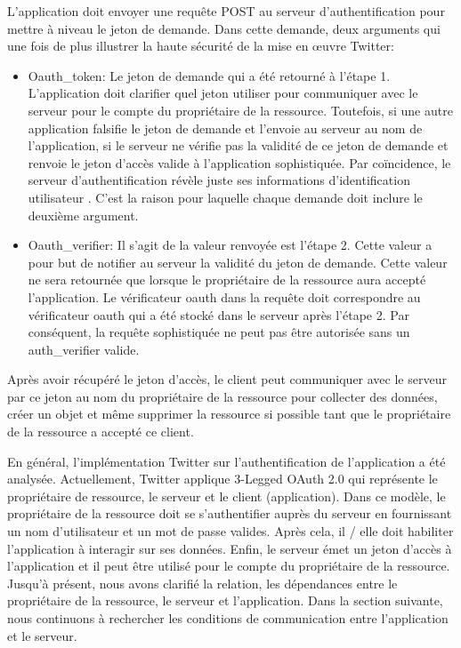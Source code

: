 L'application doit envoyer une requête POST au serveur d'authentification pour mettre à niveau le jeton de demande. Dans cette demande, deux arguments qui une fois de plus illustrer la haute sécurité de la mise en œuvre Twitter:
\begin{itemize}
\item Oauth\_token: Le jeton de demande qui a été retourné à l'étape 1. L'application doit clarifier quel jeton utiliser pour communiquer avec le serveur pour le compte du propriétaire de la ressource. Toutefois, si une autre application falsifie le jeton de demande et l'envoie au serveur au nom de l'application, si le serveur ne vérifie pas la validité de ce jeton de demande et renvoie le jeton d'accès valide à l'application sophistiquée. Par coïncidence, le serveur d'authentification révèle juste ses informations d'identification utilisateur . C'est la raison pour laquelle chaque demande doit inclure le deuxième argument.
\item Oauth\_verifier: Il s'agit de la valeur renvoyée est l'étape 2. Cette valeur a pour but de notifier au serveur la validité du jeton de demande. Cette valeur ne sera retournée que lorsque le propriétaire de la ressource aura accepté l'application. Le vérificateur oauth dans la requête doit correspondre au vérificateur oauth qui a été stocké dans le serveur après l'étape 2. Par conséquent, la requête sophistiquée ne peut pas être autorisée sans un auth\_verifier valide.
\end{itemize}
Après avoir récupéré le jeton d'accès, le client peut communiquer avec le serveur par ce jeton au nom du propriétaire de la ressource pour collecter des données, créer un objet et même supprimer la ressource si possible tant que le propriétaire de la ressource a accepté ce client.

En général, l'implémentation Twitter sur l'authentification de l'application a été analysée. Actuellement, Twitter applique 3-Legged OAuth 2.0 qui représente le propriétaire de ressource, le serveur et le client (application). Dans ce modèle, le propriétaire de la ressource doit se s'authentifier auprès du serveur en fournissant un nom d'utilisateur et un mot de passe valides. Après cela, il / elle doit habiliter l'application à interagir sur ses données. Enfin, le serveur émet un jeton d'accès à l'application et il peut être utilisé pour le compte du propriétaire de la ressource. Jusqu'à présent, nous avons clarifié la relation, les dépendances entre le propriétaire de la ressource, le serveur et l'application. Dans la section suivante, nous continuons à rechercher les conditions de communication entre l'application et le serveur.
		
